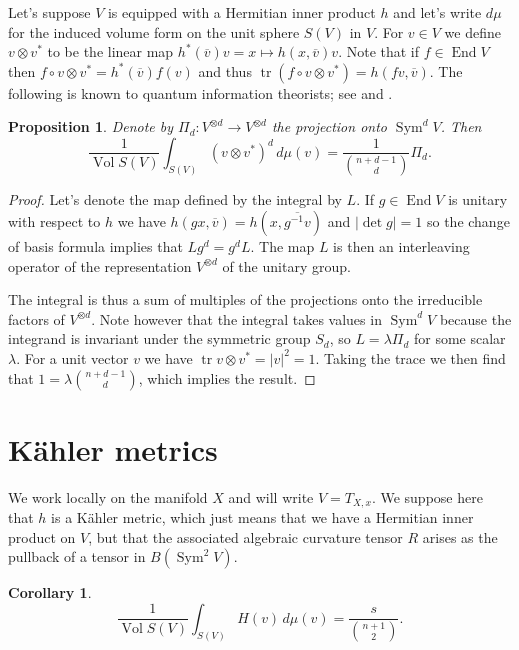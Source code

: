 \documentclass[10pt,a4paper]{amsart}
\newtheorem{prop}[theo]{Proposition}
\newtheorem{coro}[theo]{Corollary}
\theoremstyle{definition}
\def\ov#1{\overline{#1}}
\def\d{\,d}
\DeclareMathOperator{\Sym}{Sym}
\DeclareMathOperator{\tr}{tr}
\DeclareMathOperator{\Vol}{Vol}
\DeclareMathOperator{\End}{End}
\begin{document}
Let's suppose $V$ is equipped with a Hermitian inner product $h$
and let's write $d\mu$ for the induced volume form on the unit sphere $S(V)$ in
$V$. For $v \in V$ we define $v \otimes v^*$ to be the linear map
$h^*(\ov v) v = x \mapsto h(x, \ov v) v$.
Note that if $f \in \End V$ then $f \circ v \otimes v^* = h^*(\ov v) f(v)$
and thus $\tr(f \circ v \otimes v^*) = h(fv, \ov v)$.
The following is known to quantum information theorists; see
\cite{harrow2013church}
and
\cite[Chapter~7]{watrous2018theory}.

\begin{prop}
\label{prop:projection}
Denote by $\Pi_d : V^{\otimes d} \to V^{\otimes d}$ the projection onto $\Sym^d V$.
Then
$$
\frac{1}{\Vol S(V)}
\int_{S(V)} (v \otimes v^*)^{d} \d\mu(v)
= \frac{1}{\binom{n+d-1}{d}} \Pi_d.
$$
\end{prop}

\begin{proof}
Let's denote the map defined by the integral by $L$. If $g \in \End V$ is
unitary with respect to $h$ we have $h(g x, \ov v) = h(x, \ov{g^{-1} v})$ and
$|\!\det g| = 1$ so the change of basis formula implies that $L g^d = g^d L$.
The map $L$ is then an interleaving operator of the representation $V^{\otimes d}$
of the unitary group.

The integral is thus a sum of multiples of the projections onto the irreducible
factors of $V^{\otimes d}$.
Note however that the integral takes values in $\Sym^d V$ because the integrand
is invariant under the symmetric group $S_d$, so $L = \lambda \Pi_d$ for some
scalar $\lambda$. For a unit vector $v$ we have $\tr v \otimes v^* = |v|^2 =
1$.
Taking the trace we then find that $1 = \lambda \binom{n+d-1}{d}$,
which implies the result.
\end{proof}


\section{K\"ahler metrics}

We work locally on the manifold $X$ and will write $V = T_{X,x}$.
We suppose here that $h$ is a K\"ahler metric, which just means that we have a Hermitian inner product on $V$, but that the associated algebraic curvature tensor $R$ arises as
the pullback of a tensor in $B(\Sym^2 V)$.

\begin{coro}
$$
\frac{1}{\Vol S(V)} \int_{S(V)}
\!\!\!
H(v)  \d\mu(v)
= \frac{s}{\binom{n+1}{2}}.
$$
\end{coro}
\end{document}
